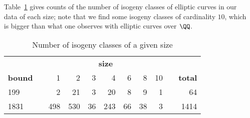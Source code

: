 \documentclass{amsart}
\begin{document}
Table~\ref{table:isogeny-sizes} gives counts of the number of isogeny
classes of elliptic curves in our data of each size; note that we find some
isogeny classes of cardinality $10$, which is bigger than what one
observes with elliptic curves over $\QQ$.
\begin{center}
\begin{table}[h]
\caption{Number of isogeny classes of a given size\label{table:isogeny-sizes}}
\begin{tabular}{@{}lcrrrrrrrcr@{}}\toprule
& \phantom{a} & \multicolumn{7}{c}{\textbf{size}} & \phantom{a} & \\\cmidrule{3-9}
\textbf{bound} & & 1   & 2   & 3  & 4   & 6  & 8  & 10 & & \textbf{total} \\\midrule
199  & & 2   & 21  & 3  & 20  & 8  & 9  & 1  & & 64    \\
1831 & & 498 & 530 & 36 & 243 & 66 & 38 & 3  & & 1414  \\\bottomrule
\end{tabular}
\end{table}
\end{center}
\end{document}
